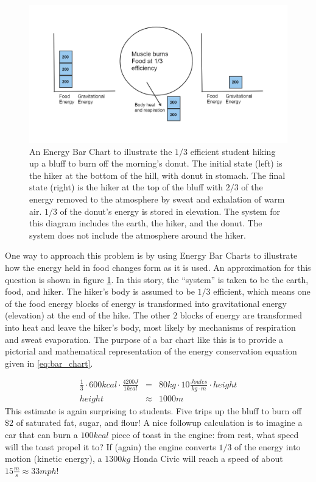 \documentclass[prb,preprint]{revtex4-2}
\newcommand{\bea}{\begin{eqnarray}}
\newcommand{\eea}{\end{eqnarray}}
\begin{document}
\begin{figure}[h]
\centering
\includegraphics[width=\columnwidth]{bar_chart.png}
\caption{An Energy Bar Chart to illustrate the $1/3$ efficient student hiking up a bluff to burn off the morning's donut.  The initial state (left) is the hiker at the bottom of the hill, with donut in stomach.  The final state (right) is the hiker at the top of the bluff with $2/3$ of the energy removed to the atmosphere by sweat and exhalation of warm air. $1/3$ of the donut's energy is stored in elevation.  The system for this diagram includes the earth, the hiker, and the donut.  The system does not include the atmosphere around the hiker.  
}
\label{bar_chart}
\end{figure}

One way to approach this problem is by using Energy Bar Charts \cite{energy_bar_charts} to illustrate how the energy held in food changes form as it is used.  An approximation for this question is shown in figure \ref{bar_chart}.  
In this story, the ``system'' is taken to be the earth, food, and hiker.  The hiker's body is assumed to be $1/3$ efficient, which means one of the food energy blocks of energy is transformed into gravitational energy (elevation) at the end of the hike.  
The other $2$ blocks of energy are transformed into heat and leave the hiker's body, most likely by mechanisms of respiration and sweat evaporation. The purpose of a bar chart like this is to provide a pictorial and mathematical representation of the energy conservation equation given in \ref{eq:bar_chart}.         

\bea
\frac{1}{3}\cdot600kcal\cdot\frac{4200J}{1kcal} 
	&=& 80kg\cdot10\frac{Joules}{kg\cdot m}\cdot height \label{eq:bar_chart}\\
height &\approx&  1000 m
\eea
This estimate is again surprising to students.  Five trips up the bluff to burn off $\$2$ of saturated fat, sugar, and flour!  A nice followup calculation is to imagine a car that can burn a $100kcal$ piece of toast in the engine: from rest, what speed will the toast propel it to? If (again) the engine converts $1/3$ of the energy into motion (kinetic energy), a $1300kg$ Honda Civic will reach a speed of about $15\frac{m}{s}\approx33mph$!  
\end{document}
